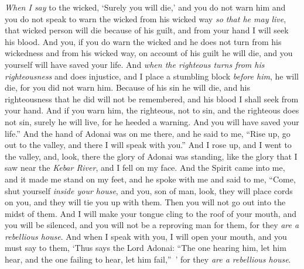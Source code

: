 \begin{biblechapter}
\verse \textit{When I say} to the wicked, ‘Surely you will die,’ and you do not warn him and you do not speak to warn the wicked from his wicked way \textit{so that he may live}, that wicked person will die because of his guilt, and from your hand I will seek his blood.
\verse And you, if you do warn the wicked and he does not turn from his wickedness and from his wicked way, on account of his guilt he will die, and you yourself will have saved your life.
\verse And \textit{when the righteous turns from his righteousness} and does injustice, and I place a stumbling block \textit{before him}, he will die, for you did not warn him. Because of his sin he will die, and his righteousness that he did will not be remembered, and his blood I shall seek from your hand.
\verse And if you warn him, the righteous, not to sin, and the righteous does not sin, surely he will live, for he heeded a warning. And you will have saved your life.”
\verse And the hand of Adonai was on me there, and he said to me, “Rise up, go out to the valley, and there I will speak with you.”
\verse And I rose up, and I went to the valley, and, look, there the glory of Adonai was standing, like the glory that I saw near the \textit{Kebar River}, and I fell on my face.
\verse And the Spirit came into me, and it made me stand on my feet, and he spoke with me and said to me, “Come, shut yourself \textit{inside your house},
\verse and you, son of man, look, they will place cords on you, and they will tie you up with them. Then you will not go out into the midst of them.
\verse And I will make your tongue cling to the roof of your mouth, and you will be silenced, and you will not be a reproving man for them, for they \textit{are a rebellious house}.
\verse And when I speak with you, I will open your mouth, and you must say to them, ‘Thus says the Lord Adonai: “The one hearing him, let him hear, and the one failing to hear, let him fail,” ’ for they \textit{are a rebellious house}.
\end{biblechapter}

